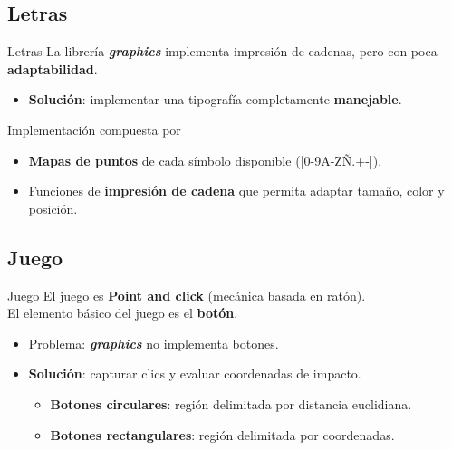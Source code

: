 \subsection{Letras}
\begin{frame}{Letras}
La librería \textbf{\textit{graphics}} implementa impresión de cadenas, pero con poca \textbf{adaptabilidad}.
    \begin{itemize}
        \item \textbf{Solución}: implementar una tipografía completamente \textbf{manejable}.\\
    \end{itemize}
    
    Implementación compuesta por
    \begin{itemize}
        \item \textbf{Mapas de puntos} de cada símbolo disponible ([0-9A-ZÑ.+-]).
        \item Funciones de \textbf{impresión de cadena} que permita adaptar tamaño, color y posición.
    \end{itemize}
    
\end{frame}

\subsection{Juego}
\begin{frame}{Juego}
    El juego es \textbf{Point and click} (mecánica basada en ratón).\\
    El elemento básico del juego es el \textbf{botón}.\\
    \begin{itemize}
        \item Problema: \textbf{\textit{graphics}} no implementa botones.
        \item \textbf{Solución}: capturar clics y evaluar coordenadas de impacto.
        \begin{itemize}
            \item \textbf{Botones circulares}: región delimitada por distancia euclidiana.
            \item \textbf{Botones rectangulares}: región delimitada por coordenadas.
        \end{itemize}
    \end{itemize} 
\end{frame}

